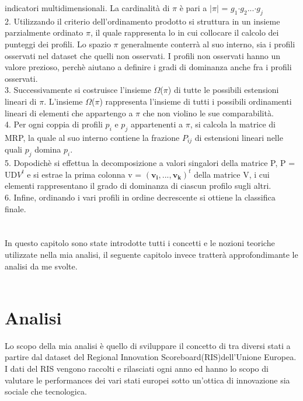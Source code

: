 \documentclass[12pt]{article}
\begin{document}
indicatori multidimensionali. La cardinalità di $\pi$ è pari a $\vert$$\pi$$\vert$  = $g_{1}$$\cdot$$g_{2}$...$\cdot$$g_{j}$\\
2. Utilizzando il criterio dell'ordinamento prodotto si struttura in un insieme parzialmente ordinato $\pi$, il quale rappresenta lo 
 in cui collocare il calcolo dei punteggi dei profili. Lo spazio $\pi$ generalmente conterrà al suo interno, sia i profili
osservati nel dataset che quelli non osservati. I profili non osservati hanno un valore prezioso, perchè aiutano a definire i 
gradi di dominanza anche fra i profili osservati. \\
3. Successivamente si costruisce l'insieme $\Omega$($\pi$) di tutte le possibili estensioni lineari di $\pi$. L'insieme $\Omega$($\pi$)
rappresenta l'insieme di tutti i possibili ordinamenti lineari di elementi che appartengo a $\pi$ che non violino le sue comparabilità.\\
4. Per ogni coppia di profili $p_{i}$ e $p_{j}$ appartenenti a $\pi$, si calcola la matrice di MRP, la quale al suo interno contiene
la frazione $P_{ij}$ di estensioni lineari nelle quali $p_{j}$ domina $p_{i}$. \\
5. Dopodichè si effettua la decomposizione a valori singalori della matrice P, P = UD$V^t$ e si estrae la prima colonna 
v = $(\mathbf{v_{i}, ..., v_{k}})^{t}$ della matrice V, i cui elementi rappresentano il grado di dominanza di ciascun profilo sugli altri.\\
6. Infine, ordinando i vari profili in ordine decrescente si ottiene la classifica finale. \\
\\
\\
In questo capitolo sono state introdotte tutti i concetti e le nozioni teoriche utilizzate nella mia analisi, il seguente capitolo invece 
tratterà approfondimante le analisi da me svolte. \\
\\
\newpage
\section{Analisi}

Lo scopo della mia analisi è quello di sviluppare il concetto di  tra diversi stati a partire dal dataset del
Regional Innovation Scoreboard(RIS)dell'Unione Europea. I dati del RIS vengono raccolti e rilasciati ogni anno ed hanno lo scopo di 
valutare le performances dei vari stati europei sotto un'ottica di innovazione sia sociale che tecnologica. \\
\\

\newpage
\end{document}
